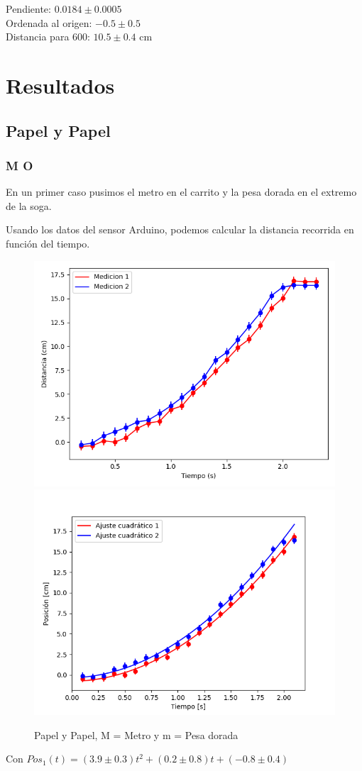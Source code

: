 \documentclass[12pt,a4]{article}
\begin{document}
Pendiente: $0.0184 \pm 0.0005$ \\

Ordenada al origen: $-0.5 \pm 0.5$ \\

Distancia para 600: $10.5 \pm 0.4$ cm \\

\section{Resultados}

\subsection{Papel y Papel}

\subsubsection{M O}

En un primer caso pusimos el metro en el carrito y la pesa dorada en el extremo de la soga.

Usando los datos del sensor Arduino, podemos calcular la distancia recorrida en función del tiempo.

\begin{figure}[H]
    \centering
    \includegraphics[width=0.4\linewidth]{TiempoVsDistanciaPapelPapelM_O.png}
    \includegraphics[width=0.4\linewidth]{ajuste2_PapelPapelM_O.png}
    \caption{Papel y Papel, M = Metro y m = Pesa dorada}
    \label{fig:PyPM_O}
\end{figure}

Con $Pos_1(t) = (3.9 \pm 0.3) t^2 + (0.2 \pm 0.8) t + (-0.8 \pm 0.4)$
\end{document}
